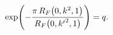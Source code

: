 \[\mathop{\exp\/}\nolimits\!\left(-\frac{\pi\mathop{R_{F}\/}\nolimits\!\left(0,k%
^{2},1\right)}{\mathop{R_{F}\/}\nolimits\!\left(0,{k^{\prime}}^{2},1\right)}%
\right)=q.\]